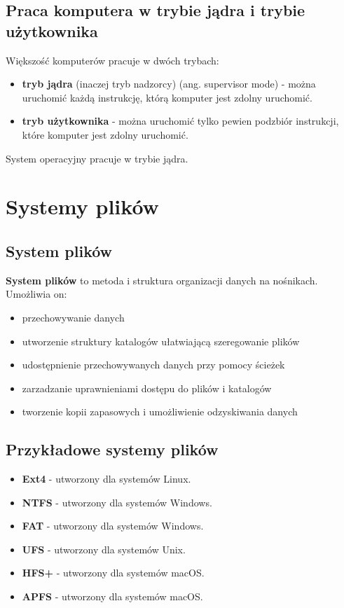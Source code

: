 \documentclass{article}
\begin{document}
\newpage\subsection{Praca komputera w trybie jądra i trybie użytkownika}
Większość komputerów pracuje w dwóch trybach:
\begin{itemize}
    \item \textbf{tryb jądra} (inaczej tryb nadzorcy) (ang. supervisor mode) - można uruchomić każdą instrukcję, którą komputer jest zdolny uruchomić.
    \item \textbf{tryb użytkownika} - można uruchomić tylko pewien podzbiór instrukcji, które komputer jest zdolny uruchomić.
\end{itemize}
System operacyjny pracuje w trybie jądra.

\section{Systemy plików}
\subsection{System plików}
\textbf{System plików} to metoda i struktura organizacji danych na nośnikach. Umożliwia on:
\begin{itemize}
    \item przechowywanie danych
    \item utworzenie struktury katalogów ułatwiającą szeregowanie plików
    \item udostępnienie przechowywanych danych przy pomocy ścieżek
    \item zarzadzanie uprawnieniami dostępu do plików i katalogów
    \item tworzenie kopii zapasowych i umożliwienie odzyskiwania danych
\end{itemize}

\subsection{Przykładowe systemy plików}
\begin{itemize}
    \item \textbf{Ext4} - utworzony dla systemów Linux.
    \item \textbf{NTFS} - utworzony dla systemów Windows.
    \item \textbf{FAT} - utworzony dla systemów Windows.
    \item \textbf{UFS} - utworzony dla systemów Unix.
    \item \textbf{HFS+} - utworzony dla systemów macOS.
    \item \textbf{APFS} - utworzony dla systemów macOS.
\end{itemize}
\end{document}
